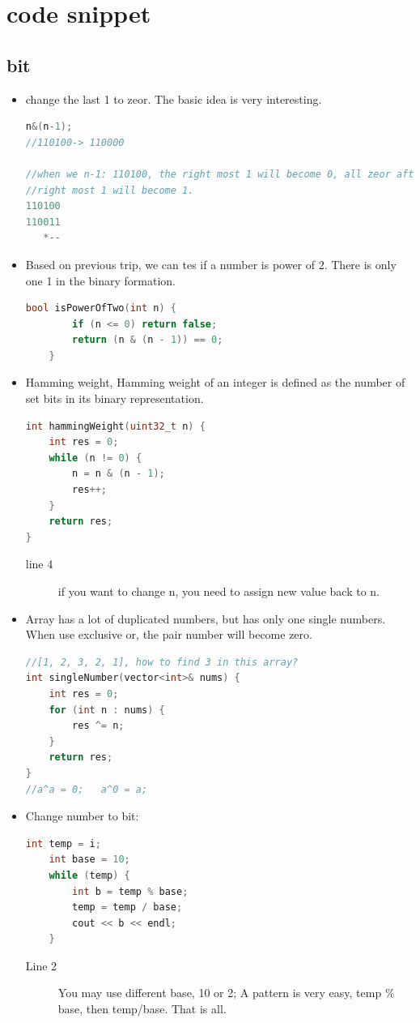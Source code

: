 \documentclass[a4paper,11pt,twoside]{book}
\begin{document}
\section{code snippet}
\subsection{bit}
\begin{itemize}
	\item change the last 1 to zeor. The basic idea is very interesting. 
\begin{lstlisting}[frame=single, language=c++]	
n&(n-1);
//110100-> 110000

//when we n-1: 110100, the right most 1 will become 0, all zeor after 
//right most 1 will become 1. 
110100
110011
   *--
\end{lstlisting}

	\item Based on previous trip, we can tes if a number is power of 2. There is only one 1 in the binary formation.
\begin{lstlisting}[frame=single, language=c++]	
	bool isPowerOfTwo(int n) {
		if (n <= 0) return false;
		return (n & (n - 1)) == 0;
	}
\end{lstlisting}

	\item Hamming weight,  Hamming weight of an integer is defined as the number of set bits in its binary representation. 
\begin{lstlisting}[frame=single, language=c++]	
int hammingWeight(uint32_t n) {
	int res = 0;
	while (n != 0) {
		n = n & (n - 1);
		res++;
	}
	return res;
}
\end{lstlisting}
\begin{description}
	\item[line 4] if you want to change n, you need to assign new value back to n. 
\end{description}

	
	\item Array has a lot of duplicated numbers, but has only one single numbers.  When use exclusive or, the pair number will become zero.
\begin{lstlisting}[frame=single, language=c++]	
//[1, 2, 3, 2, 1], how to find 3 in this array? 
int singleNumber(vector<int>& nums) {
	int res = 0;
	for (int n : nums) {
		res ^= n;
	}
	return res;
}
//a^a = 0;   a^0 = a;
\end{lstlisting}

	\item Change number to bit: 
\begin{lstlisting}[frame=single, language=c++]	
	int temp = i;
	int base = 10;
	while (temp) {
		int b = temp % base;
		temp = temp / base;
		cout << b << endl;
	}
\end{lstlisting}	
\begin{description}
	\item[Line 2] You may use different base, 10 or 2;	A pattern is very easy, temp \% base, then temp/base. That is all. 
\end{description}	
	

\end{itemize}
\end{document}
